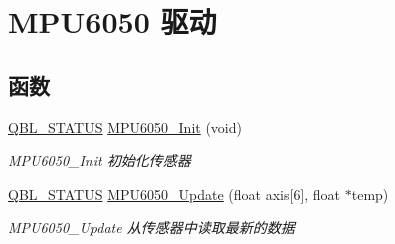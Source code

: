 \hypertarget{group__mpu6050__driver}{}\section{M\+P\+U6050 驱动}
\label{group__mpu6050__driver}
\subsection*{函数}
\begin{DoxyCompactItemize}
\item 
\hyperlink{group__qbl_ga41526b685f55486191108499fe91c30b}{Q\+B\+L\+\_\+\+S\+T\+A\+T\+US} \hyperlink{group__mpu6050__driver_gaf1d66f5d0c588885b5a2df608d00e606}{M\+P\+U6050\+\_\+\+Init} (void)
\begin{DoxyCompactList}\small\item\em M\+P\+U6050\+\_\+\+Init 初始化传感器 \end{DoxyCompactList}\item 
\hyperlink{group__qbl_ga41526b685f55486191108499fe91c30b}{Q\+B\+L\+\_\+\+S\+T\+A\+T\+US} \hyperlink{group__mpu6050__driver_ga658b9fde24666130e85df9a7ff7836f0}{M\+P\+U6050\+\_\+\+Update} (float axis\mbox{[}6\mbox{]}, float $\ast$temp)
\begin{DoxyCompactList}\small\item\em M\+P\+U6050\+\_\+\+Update 从传感器中读取最新的数据 \end{DoxyCompactList}\end{DoxyCompactItemize}
